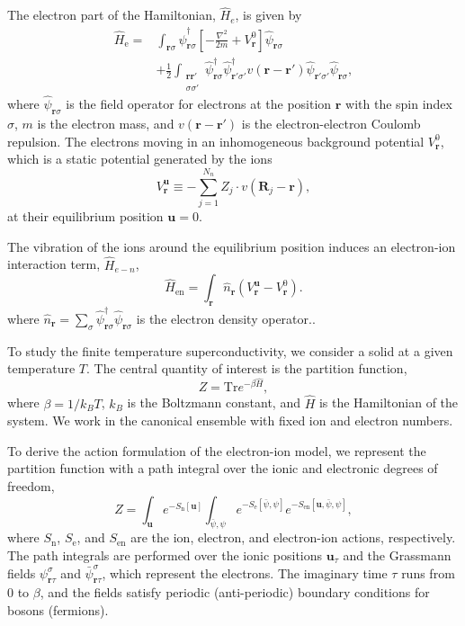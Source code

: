 \documentclass[%
 reprint,
superscriptaddress,
 amsmath,amssymb,
 aps,
prx,
]{revtex4-2}
\newcommand{\br}{\mathbf{r}}
\newcommand{\bR}{\mathbf{R}}
\newcommand{\bu}{\mathbf{u}}
\newcommand{\txe}{\text{e}}
\newcommand{\txn}{\text{n}}
\newcommand{\txen}{\text{en}}
\begin{document}
\begin{appendices}
The electron part of the Hamiltonian, $\hat{H}_e$, is given by
\begin{align*}
  \hat{H}_\txe = &\int_{\br\sigma} \hat{\psi}^{\dagger}_{\br\sigma}\left[ -\frac{\nabla^2}{2m} +V^0_{\br} \right]\hat{\psi}_{\br\sigma}  \\
            &+\frac{1}{2}\int_{\substack{\br\br'\\ \sigma\sigma'}} \hat{\psi}^{\dagger}_{\br\sigma}\hat{\psi}^{\dagger}_{\br'\sigma'}v(\br-\br')\hat{\psi}_{\br'\sigma'}\hat{\psi}_{\br\sigma},
\end{align*}
where $\hat{\psi}_{\br\sigma}$ is the field operator for electrons at the position $\br$ with the spin index $\sigma$, $m$ is the electron mass, and $v(\br-\br')$ is the electron-electron Coulomb repulsion. The electrons moving in an inhomogeneous background potential $V^0_{\br}$, which is a static potential generated by the ions
\begin{equation}
  V^{\bu}_{\br} \equiv -\sum_{j=1}^{N_n}Z_j\cdot v(\bR_j-\br),
\end{equation}
at their equilibrium position $\bu = 0$.

The vibration of the ions around the equilibrium position induces an electron-ion interaction term, $\hat{H}_{e-n}$, 
\begin{equation}
  \hat{H}_{\txen} = \int_\br \hat{n}_\br \left(V^{\bu}_{\br}-V^0_{\br}\right).
\end{equation}
where $\hat{n}_\br=\sum_{\sigma}\hat{\psi}_{\br\sigma}^\dagger\hat{\psi}_{\br\sigma}$ is the electron density operator..

To study the finite temperature superconductivity, we consider a solid at a given temperature $T$. The central quantity of interest is the partition function,
\begin{equation}
    Z=\mathrm{Tr} e^{-\beta \hat{H}},
\end{equation}
where $\beta=1/k_BT$, $k_B$ is the Boltzmann constant, and $\hat{H}$ is the Hamiltonian of the system. We work in the canonical ensemble with fixed ion and electron numbers. 

To derive the action formulation of the electron-ion model, we represent the partition function with a path integral over the ionic and electronic degrees of freedom,
\begin{equation}
\label{eq:electron-ion-Z}
    Z = \int_{\bu} e^{-S_{\txn}[\bu]}  \int_{\bar{\psi}, \psi}  e^{-S_{\txe}[\bar{\psi}, \psi]}e^{- S_{\txen}[\bu,\bar{\psi}, \psi]},
\end{equation}
where $S_{\txn}$, $S_{\txe}$, and $S_{\txen}$ are the ion, electron, and electron-ion actions, respectively. The path integrals are performed over the ionic positions $\bu_\tau$ and the Grassmann fields $\psi_{\br\tau}^{\sigma}$ and $\bar{\psi}_{\br\tau}^{\sigma}$, which represent the electrons. The imaginary time $\tau$ runs from $0$ to $\beta$, and the fields satisfy periodic (anti-periodic) boundary conditions for bosons (fermions).


\end{appendices}
\end{document}
